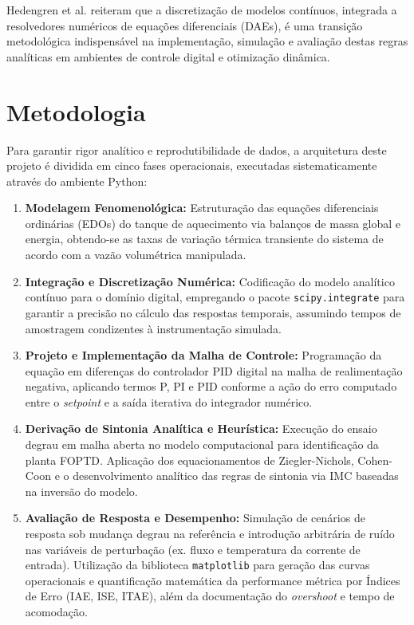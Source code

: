 \documentclass[12pt, a4paper]{article}
\begin{document}
Hedengren et al. \cite{hedengren2014} reiteram que a discretização de modelos contínuos, integrada a resolvedores numéricos de equações diferenciais (DAEs), é uma transição metodológica indispensável na implementação, simulação e avaliação destas regras analíticas em ambientes de controle digital e otimização dinâmica.

\section{Metodologia}

Para garantir rigor analítico e reprodutibilidade de dados, a arquitetura deste projeto é dividida em cinco fases operacionais, executadas sistematicamente através do ambiente Python:

\begin{enumerate}
    \item \textbf{Modelagem Fenomenológica:} Estruturação das equações diferenciais ordinárias (EDOs) do tanque de aquecimento via balanços de massa global e energia, obtendo-se as taxas de variação térmica transiente do sistema de acordo com a vazão volumétrica manipulada.
    \item \textbf{Integração e Discretização Numérica:} Codificação do modelo analítico contínuo para o domínio digital, empregando o pacote \texttt{scipy.integrate} para garantir a precisão no cálculo das respostas temporais, assumindo tempos de amostragem condizentes à instrumentação simulada.
    \item \textbf{Projeto e Implementação da Malha de Controle:} Programação da equação em diferenças do controlador PID digital na malha de realimentação negativa, aplicando termos P, PI e PID conforme a ação do erro computado entre o \textit{setpoint} e a saída iterativa do integrador numérico.
    \item \textbf{Derivação de Sintonia Analítica e Heurística:} Execução do ensaio degrau em malha aberta no modelo computacional para identificação da planta FOPTD. Aplicação dos equacionamentos de Ziegler-Nichols, Cohen-Coon e o desenvolvimento analítico das regras de sintonia via IMC baseadas na inversão do modelo.
    \item \textbf{Avaliação de Resposta e Desempenho:} Simulação de cenários de resposta sob mudança degrau na referência e introdução arbitrária de ruído nas variáveis de perturbação (ex. fluxo e temperatura da corrente de entrada). Utilização da biblioteca \texttt{matplotlib} para geração das curvas operacionais e quantificação matemática da performance métrica por Índices de Erro (IAE, ISE, ITAE), além da documentação do \textit{overshoot} e tempo de acomodação.
\end{enumerate}
\end{document}
